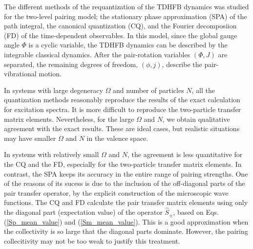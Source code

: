 \documentclass[%
superscriptaddress,
preprint,
showpacs,
nofootinbib,
amsmath,amssymb,
prc,
floatfix ]%
{revtex4-1}
\begin{document}
The different methods of the requantization of the TDHFB dynamics
was studied for the two-level pairing model;
the stationary phase approximation (SPA) of the path integral,
the canonical quantization (CQ), and the Fourier decomposiion (FD)
of the time-dependent observables.
In this model, since the global gauge angle $\Phi$ is a cyclic variable,
the TDHFB dynamics can be described by the integrable classical dynamics.
After the pair-rotation variables $(\Phi,J)$ are separated,
the remaining degrees of freedom, $(\phi,j)$, describe
the pair-vibrational motion.

In systems with large degeneracy $\Omega$ and number of particles $N$,
all the quantization methods reasonably reproduce the results of the
exact calculation for excitation spectra.
It is more difficult to reproduce the two-particle transfer matrix elements.
Nevertheless, for the large $\Omega$ and $N$,
we obtain qualitative agreement with the exact results.
These are ideal cases,
but realistic situations may have smaller $\Omega$ and $N$
in the valence space.

In systems with relatively small $\Omega$ and $N$,
the agreement is less quantitative for the CQ and the FD,
especially for the two-particle transfer matrix elements.
In contrast, the SPA keeps its accuracy in the entire range of
pairing strengths.
One of the reasons of its sucess is due to the inclusion of the off-diagonal 
parts of the pair transfer operator,
by the explicit construction of the microscopic wave functions.
The CQ and FD calculate the pair transfer matrix elements using only
the diagonal part (expectation value) of the operator $\hat{S}_\pm$,
based on Eqs. (\ref{Sp_mean_value}) and (\ref{Sm_mean_value}).
This is a good approximation when the collectivity is so large that the
diagonal parts dominate.
However, the pairing collecitivity may not be too weak to justify this
treatment.

\end{document}

